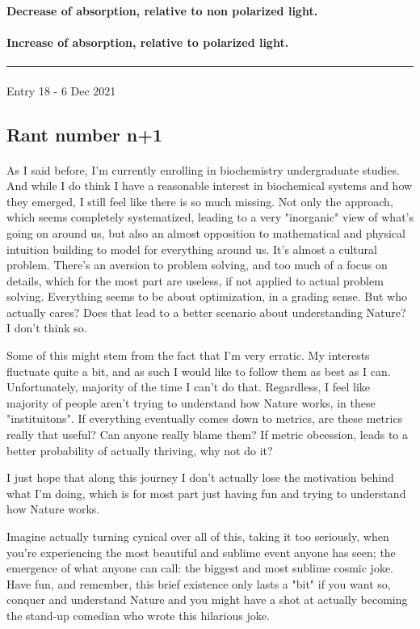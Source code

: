 \documentclass[12pt,  letterpaper]{article}
\begin{document}
\paragraph*{}
\textbf{Decrease of absorption, relative to non polarized light.}
\paragraph*{}
\textbf{Increase of absorption, relative to polarized light.}
\paragraph*{}
\hrule
\paragraph*{}
Entry 18 - 6 Dec 2021
\subsection*{Rant number n+1}
\paragraph*{}
As I said before, I'm currently enrolling in biochemistry undergraduate studies. And while I do think I have a reasonable interest in biochemical systems and how they emerged, I still feel like there is so much missing. Not only the approach, which seems completely systematized, leading to a very "inorganic" view of what's going on around us, but also an almost opposition to mathematical and physical intuition building to model for everything around us. It's almost a cultural problem. There's an aversion to problem solving, and too much of a focus on details, which for the most part are useless, if not applied to actual problem solving. Everything seems to be about optimization, in a grading sense. But who actually cares? Does that lead to a better scenario about understanding Nature? I don't think so.\par 
Some of this might stem from the fact that I'm very erratic. My interests fluctuate quite a bit, and as such I would like to follow them as best as I can. Unfortunately, majority of the time I can't do that. Regardless, I feel like majority of people aren't trying to understand how Nature works, in these "instituitons". If everything eventually comes down to metrics, are these metrics really that useful? Can anyone really blame them? If metric obcession, leads to a better probability of actually thriving, why not do it?\par 
I just hope that along this journey I don't actually lose the motivation behind what I'm doing, which is for most part just having fun and trying to understand how Nature works.\par 
Imagine actually turning cynical over all of this, taking it too seriously, when you're experiencing the most beautiful and sublime event anyone has seen; the emergence of what anyone can call: the biggest and most sublime cosmic joke. Have fun, and remember, this brief existence only lasts a "bit" if you want so, conquer and understand Nature and you might have a shot at actually becoming the stand-up comedian who wrote this hilarious joke.
\end{document}
